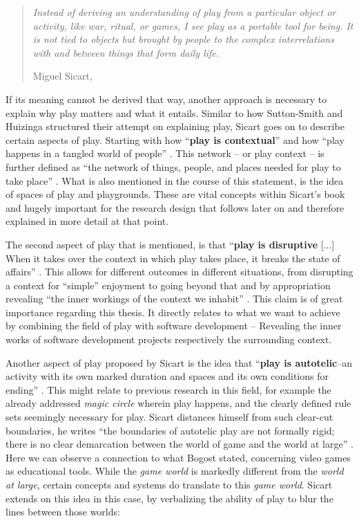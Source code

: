 \begin{quote}
  \textit{Instead of deriving an understanding of play from a particular object or activity, like war, ritual, or games, I see play as a portable tool for being. It is not tied to objects but brought by people to the complex interrelations with and between things that form daily life.}

  \footnotesize{Miguel Sicart, \cite[p. 2]{sicart2014play}}
\end{quote}

If its meaning cannot be derived that way, another approach is necessary to explain why play matters and what it entails. Similar to how Sutton-Smith and Huizinga structured their attempt on explaining play, Sicart goes on to describe certain aspects of play. Starting with how \enquote{\textbf{play is contextual}} \cite[p. 6]{sicart2014play} and how \enquote{play happens in a tangled world of people} \cite[p. 6]{sicart2014play}. This network -- or play context -- is further defined as \enquote{the network of things, people, and places needed for play to take place} \cite[p. 7]{sicart2014play}. What is also mentioned in the course of this statement, is the idea of spaces of play and playgrounds. These are vital concepts within Sicart's book and hugely important for the research design that follows later on and therefore explained in more detail at that point.

The second aspect of play that is mentioned, is that \enquote{\textbf{play is disruptive} [...] When it takes over the context in which play takes place, it breaks the state of affairs} \cite[p. 14]{sicart2014play}. This allows for different outcomes in different situations, from disrupting a context for \enquote{simple} enjoyment to going beyond that and by appropriation revealing \enquote{the inner workings of the context we inhabit} \cite[p. 15]{sicart2014play}. This claim is of great importance regarding this thesis. It directly relates to what we want to achieve by combining the field of play with software development -- Revealing the inner works of software development projects respectively the surrounding context.

Another aspect of play proposed by Sicart is the idea that \enquote{\textbf{play is autotelic}--an activity with its own marked duration and spaces and its own conditions for ending} \cite[p. 16]{sicart2014play}. This might relate to previous research in this field, for example the already addressed \textit{magic circle} wherein play happens, and the clearly defined rule sets seemingly necessary for play. Sicart distances himself from such clear-cut boundaries, he writes \enquote{the boundaries of autotelic play are not formally rigid; there is no clear demarcation between the world of game and the world at large} \cite[p. 16]{sicart2014play}. Here we can observe a connection to what Bogost stated, concerning video games as educational tools. While the \textit{game world} is markedly different from the \textit{world at large}, certain concepts and systems do translate to this \textit{game world}. Sicart extends on this idea in this case, by verbalizing the ability of play to blur the lines between those worlds:

